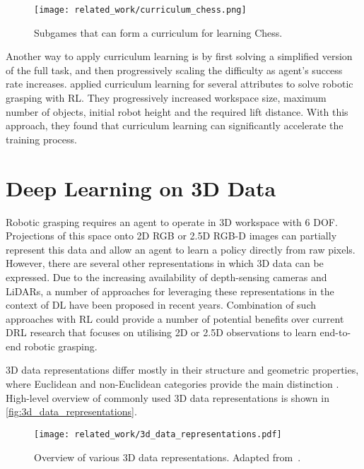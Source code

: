 \begin{figure}[ht]
    \centering
    \texttt{[image: related\_work/curriculum\_chess.png]}
    \caption{Subgames that can form a curriculum for learning Chess.~\protect\cite{narvekar_curriculum_2020}}
    \label{fig:curriculum_chess}
\end{figure}

Another way to apply curriculum learning is by first solving a simplified version of the full task, and then progressively scaling the difficulty as agent's success rate increases. \citet{breyer_comparing_2019} applied curriculum learning for several attributes to solve robotic grasping with RL. They progressively increased workspace size, maximum number of objects, initial robot height and the required lift distance. With this approach, they found that curriculum learning can significantly accelerate the training process.


\section{Deep Learning on 3D Data}

Robotic grasping requires an agent to operate in 3D workspace with 6 DOF. Projections of this space onto 2D RGB or 2.5D RGB-D images can partially represent this data and allow an agent to learn a policy directly from raw pixels. However, there are several other representations in which 3D data can be expressed. Due to the increasing availability of depth-sensing cameras and LiDARs, a number of approaches for leveraging these representations in the context of DL have been proposed in recent years. Combination of such approaches with RL could provide a number of potential benefits over current DRL research that focuses on utilising 2D or 2.5D observations to learn end-to-end robotic grasping.

3D data representations differ mostly in their structure and geometric properties, where Euclidean and non-Euclidean categories provide the main distinction \cite{ahmed_deep_2018}. High-level overview of commonly used 3D data representations is shown in \autoref{fig:3d_data_representations}.

\begin{figure}[ht]
    \centering
    \texttt{[image: related\_work/3d\_data\_representations.pdf]}
    \caption{Overview of various 3D data representations. Adapted from~\protect\citet{ahmed_deep_2018}.}
    \label{fig:3d_data_representations}
\end{figure}

